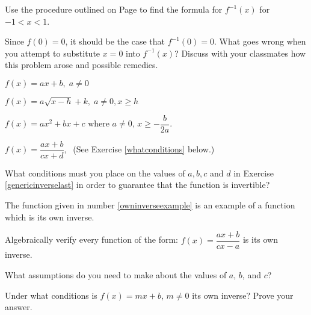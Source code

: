 \documentclass{ximera}
\begin{document}
\begin{question}
Use the procedure outlined on Page \pageref{inverseprocedure} to find the formula for $f^{-1}(x)$ for $-1 < x < 1$.
\end{question}

\begin{question}
Since $f(0) = 0$, it should be the case that $f^{-1}(0) = 0$.  What goes wrong when you attempt to substitute $x=0$ into $f^{-1}(x)$?  Discuss with your classmates how this problem arose and possible remedies.
\end{question}

\begin{question}
$f(x) = ax + b, \; a \neq 0$
\end{question}

\begin{question}
$f(x) = a\sqrt{x - h} + k, \; a \neq 0, x \geq h$


\end{question}

\begin{question}
$f(x) = ax^{2} + bx + c$ where $a \neq 0, \, x \geq -\dfrac{b}{2a}$.
\end{question}

\begin{question}
$f(x) = \dfrac{ax + b}{cx + d},\;$ (See Exercise \ref{whatconditions} below.) 

\end{question}

\begin{question}
What conditions must you place on the values of $a, b, c$ and $d$ in Exercise \ref{genericinverselast} in order to guarantee that the function is invertible?
\end{question}

\begin{question}
The function given in number \ref{owninverseexample} is an example of a function which is its own inverse.  

\end{question}

\begin{question}
Algebraically verify every function of the form: $f(x) = \dfrac{ax + b}{cx - a}$ is its own inverse.  

What assumptions do you need to make about the values of  $a$, $b$, and $c$?
\end{question}

\begin{question}
Under what conditions is $f(x) = mx + b$, $m \neq 0$ its own inverse?  Prove your answer.
\end{question}
\end{document}

